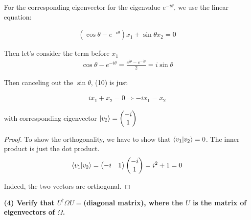 \documentclass{article}
\begin{document}
For the corresponding eigenvector for the eigenvalue $e^{-i\theta}$, we use the linear equation:

\begin{align}
    (\cos \theta - e^{-i\theta}) x_1 + \sin \theta x_2 = 0
\end{align}

Then let's consider the term before $x_1$
\begin{align}
    \cos \theta - e^{-i\theta} = \frac{e^{i\theta}-e^{-i\theta}}{2} = i \sin \theta 
\end{align}

Then canceling out the $\sin \theta$, (10) is just 

\begin{align}
    i x_1 + x_2 = 0 \Rightarrow -ix_1 = x_2
\end{align}

with corresponding eigenvector $\ket{v_2} = \begin{pmatrix}
    -i \\ 1
\end{pmatrix}$


\begin{proof}
    To show the orthogonality, we have to show that $\bra{v_1}\ket{v_2} = 0$. The inner product is just the dot product.
    \begin{align}
        \bra{v_1}\ket{v_2} = \begin{pmatrix}
            -i & 1
        \end{pmatrix} \begin{pmatrix}
            -i \\ 1
        \end{pmatrix} =  i^2 + 1 = 0
    \end{align}

    Indeed, the two vectors are orthogonal.
\end{proof}

\textbf{(4) Verify that $U^\dagger \Omega U = $(diagonal matrix), where the $U$ is the matrix of eigenvectors of $\Omega$.}
\end{document}
